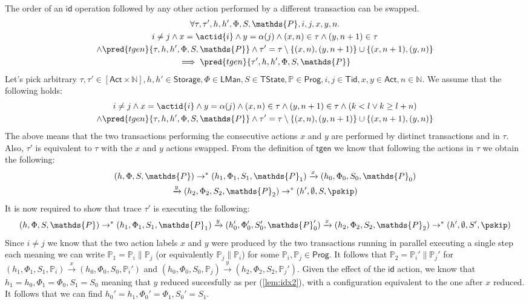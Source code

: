 \lem \label{lem:idx} The order of an $\mathsf{id}$ operation followed by any other action performed by a different transaction can be swapped.
\begin{gather*}
	\forall \tau, \tau', h, h', \Phi, S, \mathds{P}, i, j, x, y, n \ldotp \\
		i \neq j \land x = \actid{i} \land y = \alpha(j) \land (x, n) \in \tau \land (y, n+1) \in \tau \\ \land \pred{tgen}{\tau, h, h', \Phi, S, \mathds{P}} \land \tau' = \tau \setminus \{(x, n), (y, n+1)\} \cup \{ (x, n+1), (y, n) \}
		\\	 
	 \implies \pred{tgen}{\tau', h, h', \Phi, S, \mathds{P}}
\end{gather*}
Let's pick arbitrary $\tau, \tau' \in [\mathsf{Act} \times \mathds{N}], h, h' \in \mathsf{Storage}, \Phi \in \mathsf{LMan}, S \in \mathsf{TState}, \mathds{P} \in \mathsf{Prog}, i, j \in \mathsf{Tid}, x, y \in \mathsf{Act}, n \in \mathds{N}$. We assume that the following holds:
\begin{gather*}
	i \neq j \land x = \actid{i} \land y = \alpha(j) \land (x, n) \in \tau \land (y, n+1) \in \tau \land (k < l \lor k \geq l + n) \\ \land \pred{tgen}{\tau, h, h', \Phi, S, \mathds{P}} \land \tau' = \tau \setminus \{(x, n), (y, n+1)\} \cup \{ (x, n+1), (y, n) \}
\end{gather*}
The above means that the two transactions performing the consecutive actions $x$ and $y$ are performed by distinct transactions and in $\tau$. Also, $\tau'$ is equivalent to $\tau$ with the $x$ and $y$ actions swapped. From the definition of $\mathsf{tgen}$ we know that following the actions in $\tau$ we obtain the following:
\begin{gather}
	\label{lem:idx1} (h, \Phi, S, \mathds{P}) \rightarrow^* (h_1, \Phi_1, S_1, \mathds{P}_1) \xrightarrow{x} (h_0, \Phi_0, S_0, \mathds{P}_0) \\
	\label{lem:idx2} \xrightarrow{y} (h_2, \Phi_2, S_2, \mathds{P}_2) \rightarrow^* (h', \emptyset, S, \pskip)
\end{gather}
It is now required to show that trace $\tau'$ is executing the following:
\[
	(h, \Phi, S, \mathds{P}) \rightarrow^* (h_1, \Phi_1, S_1, \mathds{P}_1) \xrightarrow{y} (h_0', \Phi_0', S_0', \mathds{P}_0') \xrightarrow{x} (h_2, \Phi_2, S_2, \mathds{P}_2) \rightarrow^* (h', \emptyset, S', \pskip)
\]
Since $i \neq j$ we know that the two action labels $x$ and $y$ were produced by the two transactions running in parallel executing a single step each meaning we can write $\mathds{P}_1 = \mathds{P}_i \| \mathds{P}_j$ (or equivalently $\mathds{P}_j \| \mathds{P}_i$) for some $\mathds{P}_i, \mathds{P}_j \in \mathsf{Prog}$. It follows that $\mathds{P}_2 = \mathds{P}_i' \| \mathds{P}_j'$ for $(h_1, \Phi_1, S_1, \mathds{P}_i) \xrightarrow{x} (h_0, \Phi_0, S_0, \mathds{P}_i')$ and $(h_0, \Phi_0, S_0, \mathds{P}_j) \xrightarrow{y} (h_2, \Phi_2, S_2, \mathds{P}_j')$. Given the effect of the $\mathsf{id}$ action, we know that $h_1 = h_0, \Phi_1 = \Phi_0, S_1 = S_0$ meaning that $y$ reduced succesfully as per (\ref{lem:idx2}), with a configuration equivalent to the one after $x$ reduced. It follows that we can find $h_0' = h_1, \Phi_0' = \Phi_1, S_0' = S_1$.

